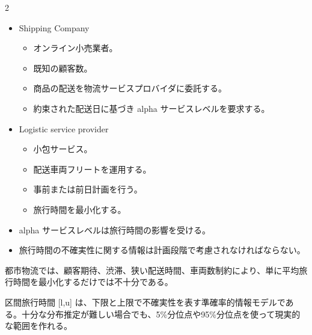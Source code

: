 \clearpage
{}
\begin{multicols}{2}\footnotesize\raggedcolumns
{}
\begin{itemize}
\item Shipping Company
\begin{itemize}
\item オンライン小売業者。
\item 既知の顧客数。
\item 商品の配送を物流サービスプロバイダに委託する。
\item 約束された配送日に基づき alpha サービスレベルを要求する。
\end{itemize}
\item Logistic service provider
\begin{itemize}
\item 小包サービス。
\item 配送車両フリートを運用する。
\item 事前または前日計画を行う。
\item 旅行時間を最小化する。
\end{itemize}
\item alpha サービスレベルは旅行時間の影響を受ける。
\item 旅行時間の不確実性に関する情報は計画段階で考慮されなければならない。
\end{itemize}
都市物流では、顧客期待、渋滞、狭い配送時間、車両数制約により、単に平均旅行時間を最小化するだけでは不十分である。\par

区間旅行時間 [l,u] は、下限と上限で不確実性を表す準確率的情報モデルである。十分な分布推定が難しい場合でも、5\%分位点や95\%分位点を使って現実的な範囲を作れる。\par


\end{multicols}

